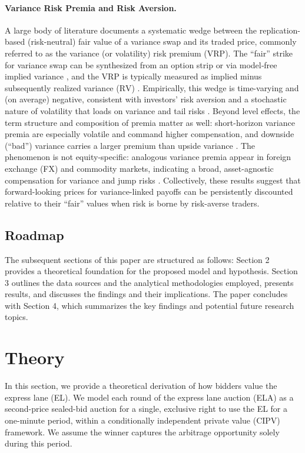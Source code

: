 \documentclass[runningheads]{llncs}
\newcommand{\RV}{\mathrm{RV}}
\begin{document}
\paragraph*{Variance Risk Premia and Risk Aversion.}
A large body of literature documents a systematic wedge between the replication-based (risk-neutral) fair value of a variance swap and its traded price, commonly referred to as the variance (or volatility) risk premium (VRP). The ``fair'' strike for variance swap can be synthesized from an option strip \cite{demeterfi1999guide} or via model‐free implied variance \cite{jiang2005modelfree}, and the VRP is typically measured as implied minus subsequently realized variance ($\RV$) \cite{carr2009variance}. Empirically, this wedge is time-varying and (on average) negative, consistent with investors’ risk aversion and a stochastic nature of volatility that loads on variance and tail risks \cite{bakshi2003delta,bollerslev2009expected,broadie2007model,bollerslev2011tails}. Beyond level effects, the term structure and composition of premia matter as well: short-horizon variance premia are especially volatile and command higher compensation, and downside (``bad'') variance carries a larger premium than upside variance \cite{dewbecker2017price,aitsahalia2020term,feunou2018downside}. The phenomenon is not equity‐specific: analogous variance premia appear in foreign exchange (FX) and commodity markets, indicating a broad, asset-agnostic compensation for variance and jump risks \cite{londono2017fxvrp,prokopczuk2017commodityvrp,vantassel2018equityvrp}. Collectively, these results suggest that forward-looking prices for variance-linked payoffs can be persistently discounted relative to their ``fair'' values when risk is borne by risk-averse traders.

\subsection{Roadmap} %
The subsequent sections of this paper are structured as follows: Section 2 provides a theoretical foundation for the proposed model and hypothesis. Section 3 outlines the data sources and the analytical methodologies employed, presents results, and discusses the findings and their implications. The paper concludes with Section 4, which summarizes the key findings and potential future research topics.


\section{Theory}\label{sec:theory}
In this section, we provide a theoretical derivation of how bidders value the express lane (EL). We model each round of the express lane auction (ELA) as a second-price sealed-bid auction for a single, exclusive right to use the EL for a one-minute period, within a conditionally independent private value (CIPV) framework. We assume the winner captures the arbitrage opportunity solely during this period.
\end{document}
